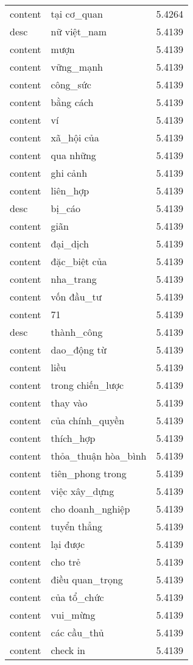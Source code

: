 \documentclass{article}
\begin{document}
\begin{tabular}{lll}
content & tại cơ\_quan & 5.4264\\
desc & nữ việt\_nam & 5.4139\\
content & mượn & 5.4139\\
content & vững\_mạnh & 5.4139\\
content & công\_sức & 5.4139\\
content & bằng cách & 5.4139\\
content & ví & 5.4139\\
content & xã\_hội của & 5.4139\\
content & qua những & 5.4139\\
content & ghi cảnh & 5.4139\\
content & liên\_hợp & 5.4139\\
desc & bị\_cáo & 5.4139\\
content & giãn & 5.4139\\
content & đại\_dịch & 5.4139\\
content & đặc\_biệt của & 5.4139\\
content & nha\_trang & 5.4139\\
content & vốn đầu\_tư & 5.4139\\
content & 71 & 5.4139\\
desc & thành\_công & 5.4139\\
content & dao\_động từ & 5.4139\\
content & liều & 5.4139\\
content & trong chiến\_lược & 5.4139\\
content & thay vào & 5.4139\\
content & của chính\_quyền & 5.4139\\
content & thích\_hợp & 5.4139\\
content & thỏa\_thuận hòa\_bình & 5.4139\\
content & tiên\_phong trong & 5.4139\\
content & việc xây\_dựng & 5.4139\\
content & cho doanh\_nghiệp & 5.4139\\
content & tuyển thẳng & 5.4139\\
content & lại được & 5.4139\\
content & cho trẻ & 5.4139\\
content & điều quan\_trọng & 5.4139\\
content & của tổ\_chức & 5.4139\\
content & vui\_mừng & 5.4139\\
content & các cầu\_thủ & 5.4139\\
content & check in & 5.4139\\

\end{tabular}
\end{document}
